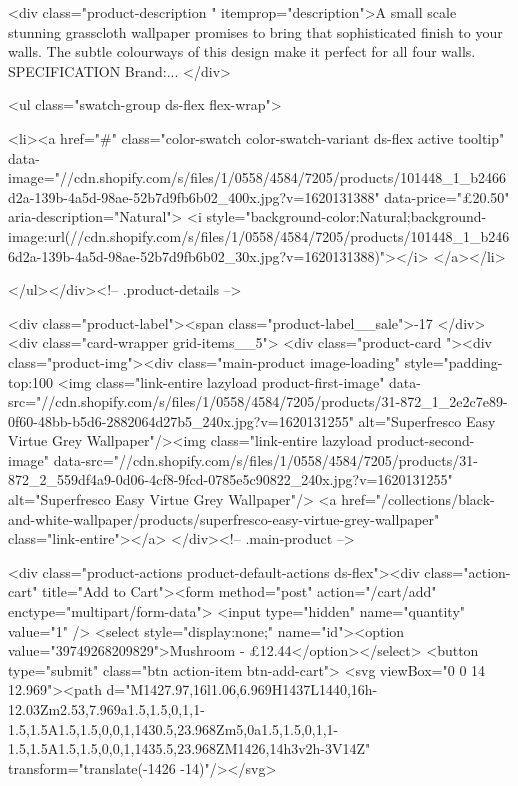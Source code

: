 {{{{{{{<div class="product-description " itemprop="description">A small scale stunning grasscloth wallpaper promises to bring that sophisticated finish to your walls. The subtle colourways of this design make it perfect for all four walls. SPECIFICATION Brand:...
</div>



<ul class="swatch-group ds-flex flex-wrap">
        
<li><a href="#" class="color-swatch color-swatch-variant ds-flex active tooltip" data-image="//cdn.shopify.com/s/files/1/0558/4584/7205/products/101448_1_b2466d2a-139b-4a5d-98ae-52b7d9fb6b02_400x.jpg?v=1620131388" data-price="£20.50" aria-description="Natural">
              <i style="background-color:Natural;background-image:url(//cdn.shopify.com/s/files/1/0558/4584/7205/products/101448_1_b2466d2a-139b-4a5d-98ae-52b7d9fb6b02_30x.jpg?v=1620131388)"></i>
            </a></li>

      </ul></div><!-- .product-details -->

<div class="product-label"><span class="product-label__sale">-17%
          </div><div class="card-wrapper grid-items__5">
            <div class="product-card "><div class="product-img"><div class="main-product image-loading" style="padding-top:100%
      <img class="link-entire lazyload product-first-image" data-src="//cdn.shopify.com/s/files/1/0558/4584/7205/products/31-872_1_2e2c7e89-0f60-48bb-b5d6-2882064d27b5_240x.jpg?v=1620131255" alt="Superfresco Easy Virtue Grey Wallpaper"/><img class="link-entire lazyload product-second-image" data-src="//cdn.shopify.com/s/files/1/0558/4584/7205/products/31-872_2_559df4a9-0d06-4cf8-9fcd-0785e5c90822_240x.jpg?v=1620131255" alt="Superfresco Easy Virtue Grey Wallpaper"/>
      <a href="/collections/black-and-white-wallpaper/products/superfresco-easy-virtue-grey-wallpaper" class="link-entire"></a>
    </div><!-- .main-product -->
  
<div class="product-actions product-default-actions ds-flex"><div class="action-cart" title="Add to Cart"><form method="post" action="/cart/add" enctype="multipart/form-data">
            <input type="hidden" name="quantity" value="1" />
            <select style="display:none;" name="id"><option value="39749268209829">Mushroom - £12.44</option></select>
            <button type="submit" class="btn action-item btn-add-cart">
              <svg viewBox="0 0 14 12.969"><path d="M1427.97,16l1.06,6.969H1437L1440,16h-12.03Zm2.53,7.969a1.5,1.5,0,1,1-1.5,1.5A1.5,1.5,0,0,1,1430.5,23.968Zm5,0a1.5,1.5,0,1,1-1.5,1.5A1.5,1.5,0,0,1,1435.5,23.968ZM1426,14h3v2h-3V14Z" transform="translate(-1426 -14)"/></svg>

}}}}}}}
